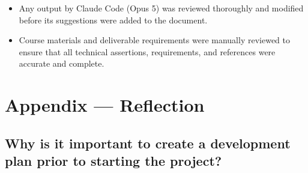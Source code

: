 \documentclass{article}
\begin{document}

\begin{itemize}
\item Any output by Claude Code (Opus 5) was reviewed thoroughly and modified
before its suggestions were added to the document.
\item Course materials and deliverable requirements were manually reviewed to ensure that all technical assertions, requirements, and references were accurate and complete.
\end{itemize}

\newpage{}

\section*{Appendix --- Reflection}


% 



\subsection*{Why is it important to create a development plan prior to starting the project?}
\end{document}
